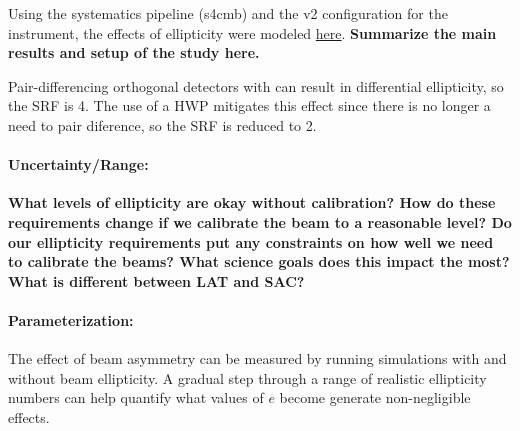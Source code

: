 Using the systematics pipeline (s4cmb) and the v2 configuration for the instrument, the effects of ellipticity were modeled \href{http://simonsobservatory.wikidot.com/instrument-systematic-systmodule#toc5}{here}. \textbf{Summarize the main results and setup of the study here.}

Pair-differencing orthogonal detectors with can result in differential ellipticity, so the SRF is 4. The use of a HWP mitigates this effect since there is no longer a need to pair diference, so the SRF is reduced to 2.

\paragraph{Uncertainty/Range:}
\textbf{What levels of ellipticity are okay without calibration? How do these requirements change if we calibrate the beam to a reasonable level? Do our ellipticity requirements put any constraints on how well we need to calibrate the beams? What science goals does this impact the most? What is different between LAT and SAC?}

\paragraph{Parameterization:}
The effect of beam asymmetry can be measured by running simulations with and without beam ellipticity. A gradual step through a range of realistic ellipticity numbers can help quantify what values of $e$ become generate non-negligible effects.


